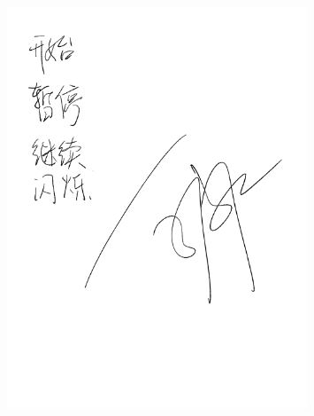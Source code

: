 \documentclass[UTF8]{ctexart}
\numberwithin{figure}{subsection}
\numberwithin{table}{subsection}
\numberwithin{equation}{subsection}
\begin{document}
\begin{figure}[H]
    \begin{center}
        \includegraphics[width=0.8\textwidth]{original pic/sign.png}
    \end{center}
\end{figure}



\end{document}
